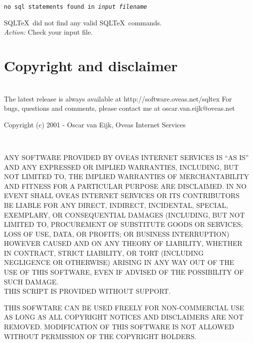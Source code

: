 \documentclass{article}
\newcommand{\vs}{\vspace{3mm}}
\begin{document}
\vs

\noindent\texttt{no sql statements found in \textit{input filename}}

\vspace{1mm}

\noindent SQL\TeX\ did not find any valid SQL\TeX\ commands. \\
\textit{Action:} Check your input file.

\section{Copyright and disclaimer}

\noindent\hrulefill \\
The latest release is always available at http://software.oveas.net/sqltex
For bugs, questions and comments, please contact me at
oscar.van.eijk$@$oveas.net

\vspace{3mm}

\noindent Copyright (c) 2001 - Oscar van Eijk, Oveas Internet Services

\noindent\hrulefill \\

\begin{small}
\noindent ANY SOFTWARE PROVIDED BY OVEAS INTERNET SERVICES IS ``AS IS'' AND ANY
EXPRESSED OR IMPLIED WARRANTIES, INCLUDING, BUT NOT LIMITED TO, THE IMPLIED
WARRANTIES OF MERCHANTABILITY AND FITNESS FOR A PARTICULAR PURPOSE ARE
DISCLAIMED. IN NO EVENT SHALL OVEAS INTERNET SERVICES OR ITS CONTRIBUTORS BE
LIABLE FOR ANY DIRECT, INDIRECT, INCIDENTAL, SPECIAL, EXEMPLARY, OR
CONSEQUENTIAL DAMAGES (INCLUDING, BUT NOT LIMITED TO, PROCUREMENT OF
SUBSTITUTE GOODS OR SERVICES; LOSS OF USE, DATA, OR PROFITS; OR BUSINESS
INTERRUPTION) HOWEVER CAUSED AND ON ANY THEORY OF LIABILITY, WHETHER IN
CONTRACT, STRICT LIABILITY, OR TORT (INCLUDING NEGLIGENCE OR OTHERWISE)
ARISING IN ANY WAY OUT OF THE USE OF THIS SOFTWARE, EVEN IF ADVISED OF
THE POSSIBILITY OF SUCH DAMAGE. \\
THIS SCRIPT IS PROVIDED WITHOUT SUPPORT.

\vspace{2mm}

\noindent THIS SOFWTARE CAN BE USED FREELY FOR NON-COMMERCIAL USE AS LONG AS ALL
COPYRIGHT NOTICES AND DISCLAIMERS ARE NOT REMOVED.
MODIFICATION OF THIS SOFTWARE IS NOT ALLOWED WITHOUT PERMISSION OF THE
COPYRIGHT HOLDERS.
\end{small}
\end{document}
